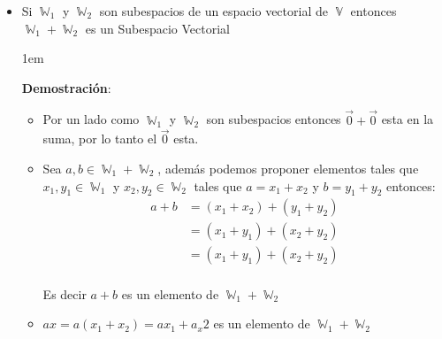 \documentclass[12pt, fleqn]{report}                             %
\newenvironment{SmallIndentation}[1][0.75em]                    %
        {\begin{adjustwidth}{#1}{}\begin{footnotesize}}             %
        {\end{footnotesize}\end{adjustwidth}}                       %
\theoremstyle{break}                                            %
\DeclareMathOperator \VectorSet    {\mathbb{V}}                 %
\DeclareMathOperator \SubVectorSet {\mathbb{W}}                 %
\begin{document}
                \begin{itemize}
                    
                    \item 
                        Si $\SubVectorSet_1$ y $\SubVectorSet_2$ son subespacios de un espacio vectorial de
                        $\VectorSet$ entonces $\SubVectorSet_1 + \SubVectorSet_2$ es un Subespacio Vectorial

                            \begin{SmallIndentation}[1em]
                                \textbf{Demostración}:
                                
                                \begin{itemize}
                                    \item Por un lado como $\SubVectorSet_1$ y $\SubVectorSet_2$ son subespacios
                                        entonces $\vec{0} + \vec{0}$ esta en la suma, por lo tanto el $\vec{0}$
                                        esta.

                                    \item Sea $a, b \in \SubVectorSet_1 + \SubVectorSet_2$, además podemos
                                        proponer elementos tales que $x_1, y_1 \in \SubVectorSet_1$ y 
                                        $x_2, y_2 \in \SubVectorSet_2$ tales que $a=x_1+x_2$ y $b=y_1+y_2$
                                        entonces:
                                        \begin{align*}
                                            a + b
                                                &= (x_1 + x_2) + (y_1 + y_2)    \\ 
                                                &= (x_1 + y_1) + (x_2 + y_2)    \\ 
                                                &= (x_1 + y_1) + (x_2 + y_2)    \\ 
                                        \end{align*}

                                        Es decir $a+b$ es un elemento de $\SubVectorSet_1 + \SubVectorSet_2$

                                    \item $ax = a(x_1 + x_2) = ax_1 + a_x2$
                                        es un elemento de $\SubVectorSet_1 + \SubVectorSet_2$

                                \end{itemize}
                            
                            \end{SmallIndentation}

                \end{itemize}
\end{document}
